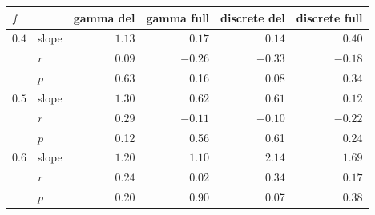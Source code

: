\begin{tabular}{llrrrr}
    \toprule
    $f$ &  & gamma del & gamma full & discrete del & discrete full \\
    \midrule
    $0.4$ & slope & $1.13$ & $0.17$ & $0.14$ & $0.40$ \\
     & $r$ & $0.09$ & $-0.26$ & $-0.33$ & $-0.18$ \\
     & $p$ & 0.63 & 0.16 & 0.08 & 0.34 \\
    \midrule
    $0.5$ & slope & $1.30$ & $0.62$ & $0.61$ & $0.12$ \\
     & $r$ & $0.29$ & $-0.11$ & $-0.10$ & $-0.22$ \\
     & $p$ & 0.12 & 0.56 & 0.61 & 0.24 \\
    \midrule
    $0.6$ & slope & $1.20$ & $1.10$ & $2.14$ & $1.69$ \\
     & $r$ & $0.24$ & $0.02$ & $0.34$ & $0.17$ \\
     & $p$ & 0.20 & 0.90 & 0.07 & 0.38 \\
    \bottomrule
\end{tabular}
